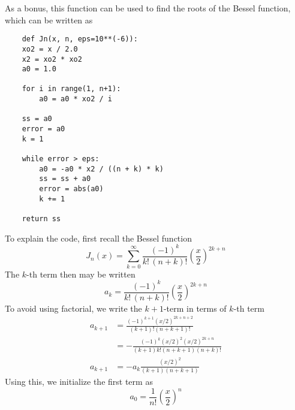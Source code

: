 \documentclass[../../../main.tex]{subfiles}
\begin{document}
As a bonus, this function can be used to find the roots of the Bessel function, which can be written as
\begin{verbatim}
    def Jn(x, n, eps=10**(-6)):
    xo2 = x / 2.0
    x2 = xo2 * xo2
    a0 = 1.0

    for i in range(1, n+1):
        a0 = a0 * xo2 / i
    
    ss = a0
    error = a0
    k = 1
    
    while error > eps:
        a0 = -a0 * x2 / ((n + k) * k)
        ss = ss + a0
        error = abs(a0)
        k += 1
    
    return ss
\end{verbatim}
To explain the code, first recall the Bessel function
\begin{equation*}
    J_n(x) = \sum_{k=0}^{\infty} \frac{(-1)^k}{k! \, (n+k)!} \left( \frac{x}{2} \right)^{2k+n}
\end{equation*}
The $k$-th term then may be written
\begin{equation*}
    a_k = \frac{(-1)^k}{k! \, (n+k)!} \left( \frac{x}{2} \right)^{2k+n}
\end{equation*}
To avoid using factorial, we write the $k+1$-term in terms of $k$-th term
\begin{align*}
    a_{k+1} & = \frac{(-1)^{k+1}(x/2)^{2k+n+2}}{(k+1)!(n+k+1)!}          \\
            & = -\frac{(-1)^k(x/2)^2(x/2)^{2k+n }}{(k+1)k!(n+k+1)(n+k)!} \\
    a_{k+1} & = -a_k\frac{(x/2)^2}{(k+1)(n+k+1)}
\end{align*}
Using this, we initialize the first term as
\begin{equation*}
    a_0=\frac{1 }{n!}\left( \frac{x }{2 } \right) ^n
\end{equation*}
\end{document}
